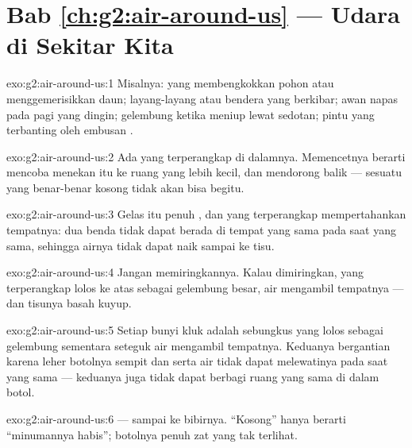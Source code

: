 \section*{Bab \ref{ch:g2:air-around-us} --- Udara di Sekitar Kita}

\begin{solution}{exo:g2:air-around-us:1}
Misalnya:  yang membengkokkan pohon atau menggemerisikkan daun;
layang-layang atau bendera yang berkibar; awan napas pada pagi yang
dingin; gelembung ketika meniup lewat sedotan; pintu yang terbanting
oleh embusan .
\end{solution}

\begin{solution}{exo:g2:air-around-us:2}
Ada  yang terperangkap di dalamnya. Memencetnya berarti mencoba
menekan  itu ke ruang yang lebih kecil, dan  mendorong
balik --- sesuatu yang benar-benar kosong tidak akan bisa begitu.
\end{solution}

\begin{solution}{exo:g2:air-around-us:3}
Gelas itu penuh , dan  yang terperangkap mempertahankan
tempatnya: dua benda tidak dapat berada di tempat yang sama pada saat
yang sama, sehingga airnya tidak dapat naik sampai ke tisu.
\end{solution}

\begin{solution}{exo:g2:air-around-us:4}
Jangan memiringkannya. Kalau dimiringkan,  yang terperangkap
lolos ke atas sebagai gelembung besar, air mengambil tempatnya ---
dan tisunya basah kuyup.
\end{solution}

\begin{solution}{exo:g2:air-around-us:5}
Setiap bunyi kluk adalah sebungkus  yang lolos sebagai gelembung
sementara seteguk air mengambil tempatnya. Keduanya bergantian karena
leher botolnya sempit dan  serta air tidak dapat melewatinya pada
saat yang sama --- keduanya juga tidak dapat berbagi ruang yang sama
di dalam botol.
\end{solution}

\begin{solution}{exo:g2:air-around-us:6}
 --- sampai ke bibirnya. ``Kosong'' hanya berarti ``minumannya
habis''; botolnya penuh zat yang tak terlihat.
\end{solution}

